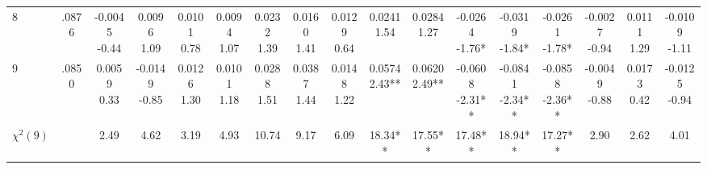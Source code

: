 \begin{landscape}
\begin{center}
{\begin{adjustbox}{max width=\textheight}
\begin{tabular}{lcccccccccccccccc}
8 & .0876 & \shortstack{-0.0045\\-0.44} & \shortstack{0.0096\\1.09} & \shortstack{0.0101\\0.78} & \shortstack{0.0094\\1.07} & \shortstack{0.0232\\1.39} & \shortstack{0.0160\\1.41} & \shortstack{0.0129\\0.64} & \shortstack{0.0241\\1.54} & \shortstack{0.0284\\1.27} & \shortstack{-0.0264\\-1.76*} & \shortstack{-0.0319\\-1.84*} & \shortstack{-0.0261\\-1.78*} & \shortstack{-0.0027\\-0.94} & \shortstack{0.0111\\1.29} & \shortstack{-0.0109\\-1.11} \\
9 & .0850 & \shortstack{0.0059\\0.33} & \shortstack{-0.0149\\-0.85} & \shortstack{0.0126\\1.30} & \shortstack{0.0101\\1.18} & \shortstack{0.0288\\1.51} & \shortstack{0.0387\\1.44} & \shortstack{0.0148\\1.22} & \shortstack{0.0574\\2.43**} & \shortstack{0.0620\\2.49**} & \shortstack{-0.0608\\-2.31**} & \shortstack{-0.0841\\-2.34**} & \shortstack{-0.0858\\-2.36**} & \shortstack{-0.0049\\-0.88} & \shortstack{0.0173\\0.42} & \shortstack{-0.0125\\-0.94} \\
$\chi^2(9)$ &  & 2.49 & 4.62 & 3.19 & 4.93 & 10.74 & 9.17 & 6.09 & 18.34** & 17.55** & 17.48** & 18.94** & 17.27** & 2.90 & 2.62 & 4.01 \\
\bottomrule
\end{tabular}
\end{adjustbox}}
\end{center}
\end{landscape}

